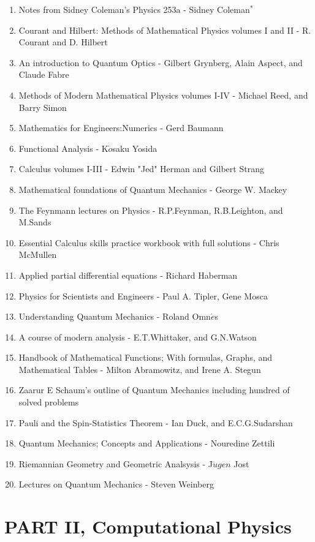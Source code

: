\documentclass[a4paper, 10pt, onepage]{elegantbook}
\begin{document}
\begin{enumerate}
\item Notes from Sidney Coleman's Physics 253a - Sidney Coleman$^*$
\item Courant and Hilbert: Methods of Mathematical Physics volumes I and II - R. Courant and D. Hilbert
\item An introduction to Quantum Optics - Gilbert Grynberg, Alain Aspect, and Claude Fabre
\item Methods of Modern Mathematical Physics volumes I-IV - Michael Reed, and Barry Simon
\item Mathematics for Engineers:Numerics - Gerd Baumann
\item Functional Analysis - K$\dot{o}$saku Yosida
\item Calculus volumes I-III - Edwin "Jed" Herman and Gilbert Strang
\item Mathematical foundations of Quantum Mechanics - George W. Mackey
\item The Feynmann lectures on Physics - R.P.Feynman, R.B.Leighton, and M.Sands
\item Essential Calculus skills practice workbook with full solutions - Chris McMullen
\item Applied partial differential equations - Richard Haberman
\item Physics for Scientists and Engineers - Paul A. Tipler, Gene Mosca
\item Understanding Quantum Mechanics - Roland Omn$\acute{e}$s
\item A course of modern analysis - E.T.Whittaker, and G.N.Watson
\item Handbook of Mathematical Functions; With formulas, Graphs, and Mathematical Tables - Milton Abramowitz, and Irene A. Stegun
\item Zaarur E Schaum's outline of Quantum Mechanics including hundred of solved problems
\item Pauli and the Spin-Statistics Theorem - Ian Duck, and E.C.G.Sudarshan
\item Quantum Mechanics; Concepts and Applications - Nouredine Zettili
\item Riemannian Geometry and Geometric Analsysis - J$\ddot{u}gen$ Jost
\item Lectures on Quantum Mechanics - Steven Weinberg
\end{enumerate}

\chapter{PART II, Computational Physics}
\end{document}
